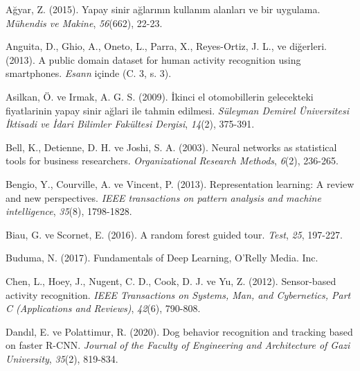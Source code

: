 \documentclass[12pt,twoside]{deuthesis}
\begin{document}

\hypertarget{refs}{}
\begin{CSLReferences}{1}{0}
\leavevmode{}%
Ağyar, Z. (2015). Yapay sinir a{ğ}lar{ı}n{ı}n kullan{ı}m alanlar{ı} ve bir uygulama. \emph{M{ü}hendis ve Makine}, \emph{56}(662), 22-23.

\leavevmode{}%
Anguita, D., Ghio, A., Oneto, L., Parra, X., Reyes-Ortiz, J. L., ve diğerleri. (2013). A public domain dataset for human activity recognition using smartphones. \emph{Esann} içinde (C. 3, s. 3).

\leavevmode{}%
Asilkan, Ö. ve Irmak, A. G. S. (2009). {İ}kinci el otomobillerin gelecekteki fiyatlarinin yapay sinir a{ğ}lari ile tahmin edilmesi. \emph{S{ü}leyman Demirel {Ü}niversitesi {İ}ktisadi ve {İ}dari Bilimler Fak{ü}ltesi Dergisi}, \emph{14}(2), 375-391.

\leavevmode{}%
Bell, K., Detienne, D. H. ve Joshi, S. A. (2003). Neural networks as statistical tools for business researchers. \emph{Organizational Research Methods}, \emph{6}(2), 236-265.

\leavevmode{}%
Bengio, Y., Courville, A. ve Vincent, P. (2013). Representation learning: A review and new perspectives. \emph{IEEE transactions on pattern analysis and machine intelligence}, \emph{35}(8), 1798-1828.

\leavevmode{}%
Biau, G. ve Scornet, E. (2016). A random forest guided tour. \emph{Test}, \emph{25}, 197-227.

\leavevmode{}%
Buduma, N. (2017). Fundamentals of Deep Learning, O'Relly Media. Inc.

\leavevmode{}%
Chen, L., Hoey, J., Nugent, C. D., Cook, D. J. ve Yu, Z. (2012). Sensor-based activity recognition. \emph{IEEE Transactions on Systems, Man, and Cybernetics, Part C (Applications and Reviews)}, \emph{42}(6), 790-808.

\leavevmode{}%
Dandıl, E. ve Polattimur, R. (2020). Dog behavior recognition and tracking based on faster R-CNN. \emph{Journal of the Faculty of Engineering and Architecture of Gazi University}, \emph{35}(2), 819-834.


\end{CSLReferences}
\end{document}
